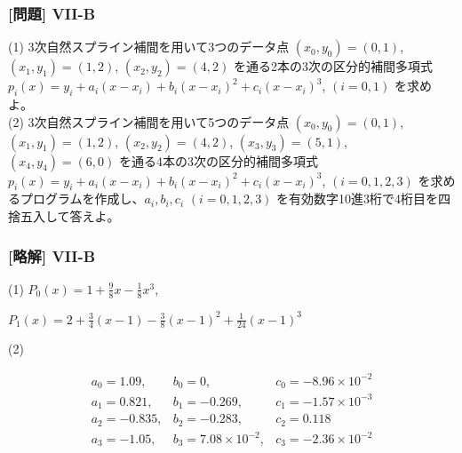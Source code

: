 \documentclass[dvipdfmx,aspectratio=169,20pt]{beamer}
\newcommand{\myfontsetting}[3]{{\fontsize{#1}{#2}\selectfont #3}}
\begin{document}
\begin{frame}
\frametitle{[問題] V\hspace{-.1em}I\hspace{-.1em}I-B}

\myfontsetting{12pt}{12pt}{
(1) 3次自然スプライン補間を用いて3つのデータ点 $(x_0,y_0)=(0,1)$, $(x_1,y_1)=(1,2)$, $(x_2,y_2)=(4,2)$ を通る2本の3次の区分的補間多項式 $p_i(x) = y_i + a_i (x-x_i) + b_i (x-x_i)^2 + c_i (x-x_i)^3$, $(i=0,1)$ を求めよ。%
}\\
\myfontsetting{12pt}{12pt}{
(2) 3次自然スプライン補間を用いて5つのデータ点 $(x_0,y_0)=(0,1)$, $(x_1,y_1)=(1,2)$, $(x_2,y_2)=(4,2)$, $(x_3,y_3)=(5,1)$, $(x_4,y_4)=(6,0)$ を通る4本の3次の区分的補間多項式 $p_i(x) = y_i + a_i (x-x_i) + b_i (x-x_i)^2 + c_i (x-x_i)^3$, $(i=0,1,2,3)$ を求めるプログラムを作成し、$a_i, b_i, c_i$ $(i=0,1,2,3)$ を有効数字10進3桁で4桁目を四捨五入して答えよ。
}
\end{frame}
\begin{frame}
\frametitle{[略解] V\hspace{-.1em}I\hspace{-.1em}I-B}
(1) $P_0(x)=1+\frac{9}{8}x - \frac{1}{8}x^3$,

\vspace{2mm}

$P_1(x)=2+\frac{3}{4}(x-1)-\frac{3}{8}(x-1)^2+\frac{1}{24}(x-1)^3$

\vspace{5mm}

(2) 

\vspace{-5mm}
\myfontsetting{18pt}{18pt}{
\[
\begin{matrix}
a_0 = 1.09, & b_0 = 0, &c_0 = -8.96\times 10^{-2}\\
a_1 = 0.821, & b_1 =-0.269, & c_1 = -1.57 \times 10^{-3}\\
a_2 = -0.835, & b_2 = -0.283, & c_2 = 0.118\\
a_3 = -1.05, & b_3 = 7.08\times 10^{-2}, & c_3 = -2.36\times 10^{-2}
\end{matrix}
\]
}

\end{frame}
\end{document}
